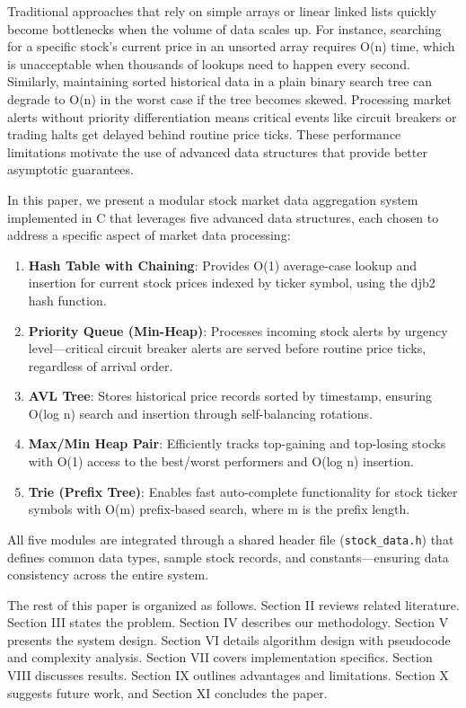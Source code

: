 \documentclass[conference]{IEEEtran}
\begin{document}
Traditional approaches that rely on simple arrays or linear linked lists quickly become bottlenecks when the volume of data scales up. For instance, searching for a specific stock's current price in an unsorted array requires O(n) time, which is unacceptable when thousands of lookups need to happen every second. Similarly, maintaining sorted historical data in a plain binary search tree can degrade to O(n) in the worst case if the tree becomes skewed. Processing market alerts without priority differentiation means critical events like circuit breakers or trading halts get delayed behind routine price ticks. These performance limitations motivate the use of advanced data structures that provide better asymptotic guarantees.

In this paper, we present a modular stock market data aggregation system implemented in C that leverages five advanced data structures, each chosen to address a specific aspect of market data processing:

\begin{enumerate}
\item \textbf{Hash Table with Chaining}: Provides O(1) average-case lookup and insertion for current stock prices indexed by ticker symbol, using the djb2 hash function.
\item \textbf{Priority Queue (Min-Heap)}: Processes incoming stock alerts by urgency level---critical circuit breaker alerts are served before routine price ticks, regardless of arrival order.
\item \textbf{AVL Tree}: Stores historical price records sorted by timestamp, ensuring O(log n) search and insertion through self-balancing rotations.
\item \textbf{Max/Min Heap Pair}: Efficiently tracks top-gaining and top-losing stocks with O(1) access to the best/worst performers and O(log n) insertion.
\item \textbf{Trie (Prefix Tree)}: Enables fast auto-complete functionality for stock ticker symbols with O(m) prefix-based search, where m is the prefix length.
\end{enumerate}

All five modules are integrated through a shared header file (\texttt{stock\_data.h}) that defines common data types, sample stock records, and constants---ensuring data consistency across the entire system.

The rest of this paper is organized as follows. Section II reviews related literature. Section III states the problem. Section IV describes our methodology. Section V presents the system design. Section VI details algorithm design with pseudocode and complexity analysis. Section VII covers implementation specifics. Section VIII discusses results. Section IX outlines advantages and limitations. Section X suggests future work, and Section XI concludes the paper.
\end{document}
